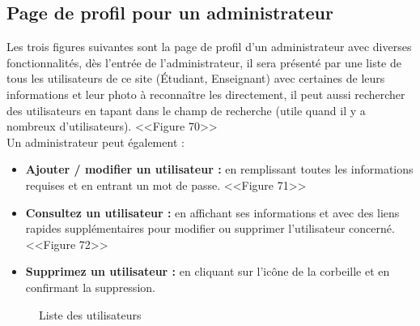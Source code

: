 \documentclass[12pt]{report}
\begin{document}
\newpage

\vspace*{-0.6in}
\subsection{Page de profil pour un administrateur}

Les trois figures suivantes sont la page de profil d'un administrateur avec diverses fonctionnalités, dès l'entrée de l'administrateur, il sera présenté par une liste de tous les utilisateurs de ce site (Étudiant, Enseignant) avec certaines de leurs informations et leur photo à reconnaître les directement, il peut aussi rechercher des utilisateurs en tapant dans le champ de recherche (utile quand il y a nombreux d'utilisateurs). <<Figure 70>>
\\
Un administrateur peut également :

\begin{itemize}
  \item \textbf{Ajouter / modifier un utilisateur :} en remplissant toutes les informations requises et en entrant un mot de passe. <<Figure 71>>
  \item \textbf{Consultez un utilisateur :} en affichant ses informations et avec des liens rapides supplémentaires pour modifier ou supprimer l'utilisateur concerné. <<Figure 72>>
  \item \textbf{Supprimez un utilisateur :} en cliquant sur l'icône de la corbeille et en confirmant la suppression.
\end{itemize}

\vspace{0.3in}

\begin{figure}[h]
\centering
\caption{Liste des utilisateurs}
\end{figure}
\end{document}
